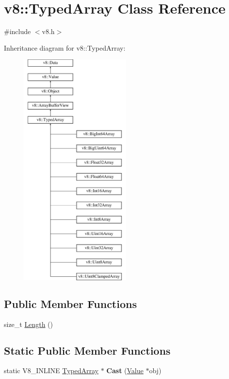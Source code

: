 \hypertarget{classv8_1_1TypedArray}{}\section{v8\+:\+:Typed\+Array Class Reference}
\label{classv8_1_1TypedArray}


{\ttfamily \#include $<$v8.\+h$>$}

Inheritance diagram for v8\+:\+:Typed\+Array\+:\begin{figure}[H]
\begin{center}
\leavevmode
\includegraphics[height=12.000000cm]{classv8_1_1TypedArray}
\end{center}
\end{figure}
\subsection*{Public Member Functions}
\begin{DoxyCompactItemize}
\item 
size\+\_\+t \mbox{\hyperlink{classv8_1_1TypedArray_abb1047225d53d960c0da9c9f83cd7042}{Length}} ()
\end{DoxyCompactItemize}
\subsection*{Static Public Member Functions}
\begin{DoxyCompactItemize}
\item 
\mbox{\label{classv8_1_1TypedArray_ac3f23cc8171d3be0815df7731140382f}} 
static V8\+\_\+\+I\+N\+L\+I\+NE \mbox{\hyperlink{classv8_1_1TypedArray}{Typed\+Array}} $\ast$ {\bfseries Cast} (\mbox{\hyperlink{classv8_1_1Value}{Value}} $\ast$obj)
\end{DoxyCompactItemize}
